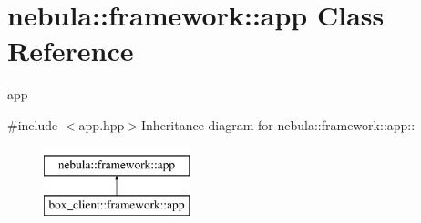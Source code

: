 \hypertarget{classnebula_1_1framework_1_1app}{
\section{nebula::framework::app Class Reference}
\label{classnebula_1_1framework_1_1app}
}


app  


{\ttfamily \#include $<$app.hpp$>$}Inheritance diagram for nebula::framework::app::\begin{figure}[H]
\begin{center}
\leavevmode
\includegraphics[height=2cm]{classnebula_1_1framework_1_1app}
\end{center}
\end{figure}
